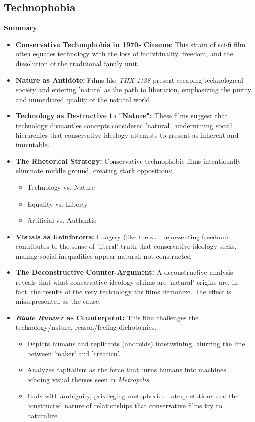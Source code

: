 \documentclass[11pt,fleqn]{book}
\begin{document}
\subsection{Technophobia}
\textbf{Summary}

\begin{itemize}
\item \textbf{Conservative Technophobia in 1970s Cinema:}  This strain of sci-fi film often equates technology with the loss of individuality, freedom, and the dissolution of the traditional family unit.

\item \textbf{Nature as Antidote:} Films like \textit{THX 1138} present escaping technological society and entering 'nature' as the path to liberation, emphasizing the purity and unmediated quality of the natural world.

\item \textbf{Technology as Destructive to "Nature":}  These films suggest that technology dismantles concepts considered 'natural', undermining social hierarchies that conservative ideology attempts to present as inherent and immutable.

\item \textbf{The Rhetorical Strategy:} Conservative technophobic films intentionally eliminate middle ground, creating stark oppositions:
    \begin{itemize}
        \item Technology vs. Nature
        \item Equality vs. Liberty
        \item Artificial vs. Authentic
    \end{itemize}

\item \textbf{Visuals as Reinforcers:}  Imagery (like the sun representing freedom) contributes to the sense of 'literal' truth that conservative ideology seeks, making social inequalities appear natural, not constructed.

\item \textbf{The Deconstructive Counter-Argument:}  A deconstructive analysis reveals that what conservative ideology claims are 'natural' origins are, in fact, the results of the very technology the films demonize.  The effect is misrepresented as the cause.

\item \textbf{\textit{Blade Runner} as Counterpoint:}  This film challenges the  technology/nature, reason/feeling dichotomies. 
    \begin{itemize}
        \item Depicts humans and replicants (androids) intertwining, blurring the line between 'maker' and 'creation'. 
        \item Analyzes capitalism as the force that turns humans into machines, echoing visual themes seen in \textit{Metropolis}.
        \item Ends with  ambiguity, privileging metaphorical interpretations and the constructed nature of relationships that conservative films try to naturalize.
    \end{itemize}
\end{itemize}
\end{document}
